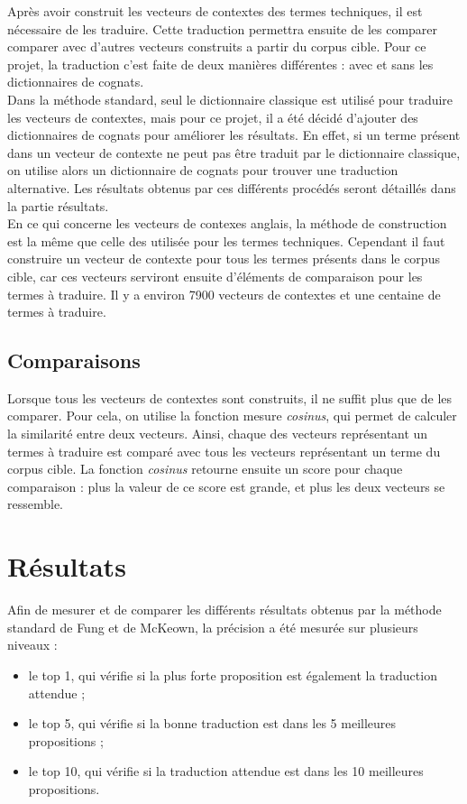 	Après avoir construit les vecteurs de contextes des termes techniques, il est nécessaire de les traduire. Cette traduction permettra ensuite de les comparer comparer avec d'autres vecteurs construits a partir du corpus cible. Pour ce projet, la traduction c'est faite de deux manières différentes : avec et sans les dictionnaires de cognats.\\
	
	Dans la méthode standard, seul le dictionnaire classique est utilisé pour traduire les vecteurs de contextes, mais pour ce projet, il a été décidé d'ajouter des dictionnaires de cognats pour améliorer les résultats. En effet, si un terme présent dans un vecteur de contexte ne peut pas être traduit par le dictionnaire classique, on utilise alors un dictionnaire de cognats pour trouver une traduction alternative. Les résultats obtenus par ces différents procédés seront détaillés dans la partie résultats.\\
	
	En ce qui concerne les vecteurs de contexes anglais, la méthode de construction est la même que celle des utilisée pour les termes techniques. Cependant il faut construire un vecteur de contexte pour tous les termes présents dans le corpus cible, car ces vecteurs serviront ensuite d'éléments de comparaison pour les termes à traduire. Il y a environ 7900 vecteurs de contextes et une centaine de termes à traduire.
	
	\subsection{Comparaisons}
	
	Lorsque tous les vecteurs de contextes sont construits, il ne suffit plus que de les comparer. Pour cela, on utilise la fonction mesure \textit{cosinus}, qui permet de calculer la similarité entre deux vecteurs. Ainsi, chaque des vecteurs représentant un termes à traduire est comparé avec tous les vecteurs représentant un terme du corpus cible. La fonction \textit{cosinus} retourne ensuite un score pour chaque comparaison : plus la valeur de ce score est grande, et plus les deux vecteurs se ressemble.
	

\section{Résultats}
	
	Afin de mesurer et de comparer les différents résultats obtenus par la méthode standard de Fung et de McKeown, la précision a été mesurée sur plusieurs niveaux : 
	\begin{itemize}
		\item le top 1, qui vérifie si la plus forte proposition est également la traduction attendue ;
		\item le top 5, qui vérifie si la bonne traduction est dans les 5 meilleures propositions ;
		\item le top 10, qui vérifie si la traduction attendue est dans les 10 meilleures propositions.
	\end{itemize}
	
